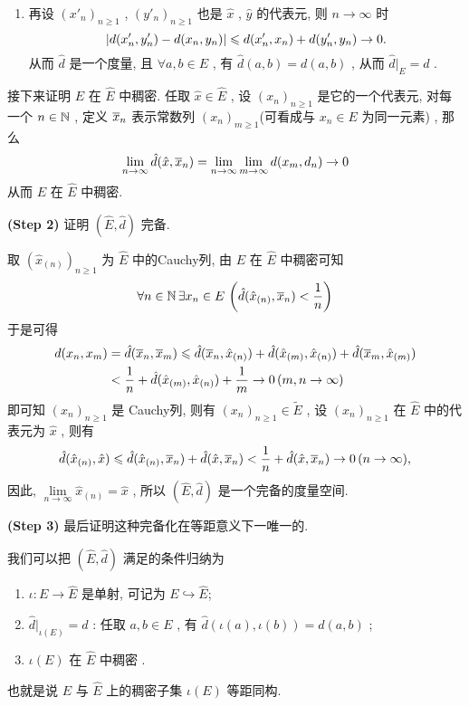 \begin{Proof}
\begin{enumerate}[(1)]
		\item 再设 $ (x'_{n})_{n\geqslant1} $ , $ (y'_{n})_{n\geqslant1} $ 也是 $ \hat{x} $ , $ \hat{y} $ 的代表元, 则 $ n\to\infty $ 时
		      \[
			      \abs{d(x'_{n}, y'_{n})-d(x_{n}, y_{n})}\leqslant d(x'_{n}, x_{n})+d(y'_{n}, y_{n})\to0.
		      \]
		      从而 $ \hat{d} $ 是一个度量, 且 $ \forall a, b\in E $ , 有 $ \hat{d}(a, b)=d(a, b) $ , 从而 $ \hat{d}|_{E}=d $ .
	\end{enumerate}
	接下来证明 $ E $ 在 $ \widehat{E} $ 中稠密. 任取 $ \hat{x}\in\widehat{E} $ , 设 $ (x_{n})_{n\geqslant1} $ 是它的一个代表元, 对每一个 $ n\in\N $ , 定义 $ \baro{x}_{n} $ 表示常数列 $ (x_{n})_{m\geqslant1} $(可看成与 $ x_{n}\in E $ 为同一元素) , 那么
	\[
		\lim_{n\to\infty}\hat{d}(\hat{x}, \baro{x}_{n})=\lim_{n\to\infty}\lim_{m\to\infty}d (x_{m}, d_{n})\to 0
	\]
	从而 $ E $ 在 $ \widehat{E} $ 中稠密.

	\textbf{(Step 2)} 证明 $ (\widehat{E}, \hat{d}) $ 完备.

	取 $ (\hat{x}_{(n)})_{n\geqslant1} $ 为 $ \widehat{E} $ 中的Cauchy列, 由 $ E $ 在 $ \widehat{E} $ 中稠密可知
	\[
		\forall n\in \N\,\exists x_{n}\in E\,\left(\hat{d}(\hat{x}_{(n)}, \baro{x}_{n})<\frac{1}{n}\right)
	\]
	于是可得
	\[
		\begin{aligned}
			d(x_{n}, x_{m}) & =\hat{d}(\baro{x}_{n}, \baro{x}_{m}) \leqslant \hat{d}(\baro{x}_{n}, \hat{x}_{(n)})+\hat{d}(\hat{x}_{(m)}, \hat{x}_{(n)})+\hat{d}(\baro{x}_{m}, \hat{x}_{(m)}) \\
			                & < \frac{1}{n}+\hat{d}(\hat{x}_{(m)}, \hat{x}_{(n)})+\frac{1}{m}\to0\,(m, n\to\infty)
		\end{aligned}
	\]
	即可知 $ (x_{n})_{n\geqslant1} $ 是 Cauchy列, 则有 $ (x_{n})_{n\geqslant1}\in\widetilde{E} $ , 设 $ (x_{n})_{n\geqslant1} $ 在 $ \widehat{E} $ 中的代表元为 $ \hat{x} $ , 则有
	\[
		\hat{d}(\hat{x}_{(n)}, \hat{x})\leqslant\hat{d}(\hat{x}_{(n)}, \baro{x}_{n})+\hat{d}(\hat{x}, \baro{x}_{n})<\frac{1}{n}+\hat{d}(\hat{x}, \baro{x}_{n})\to 0\,(n\to\infty),
	\]
	因此, $ \lim\limits_{n\to\infty}\hat{x}_{(n)}=\hat{x} $ , 所以 $ (\widehat{E}, \hat{d}) $ 是一个完备的度量空间.

	\textbf{(Step 3)} 最后证明这种完备化在等距意义下一唯一的.

	我们可以把 $ (\widehat{E}, \hat{d}) $ 满足的条件归纳为
	\begin{enumerate}[(1)]
		\item $ \iota:E\to\widehat{E} $ 是单射, 可记为 $ E\hookrightarrow \widehat{E} $;
		\item $ \hat{d}|_{\iota(E)}=d $ : 任取 $ a, b\in E $ , 有 $ \hat{d}(\iota(a), \iota(b))=d(a, b) $ ;
		\item $ \iota(E) $ 在 $ \widehat{E} $ 中稠密 .
	\end{enumerate}
	也就是说 $ E $ 与 $ \widehat{E} $ 上的稠密子集 $ \iota(E) $ 等距同构.


\end{Proof}
